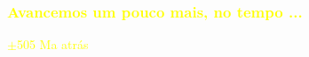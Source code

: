 \documentclass[aspectratio=169]{beamer} %
\begin{document}
{
	
	\begin{frame}
		\frametitle{\textcolor{yellow}{Avancemos um pouco mais, no tempo ...}}
	\transdissolve	
	
	\flushright
	\textcolor{yellow}{$\pm$505 Ma atrás}


\end{frame}
}
\end{document}
